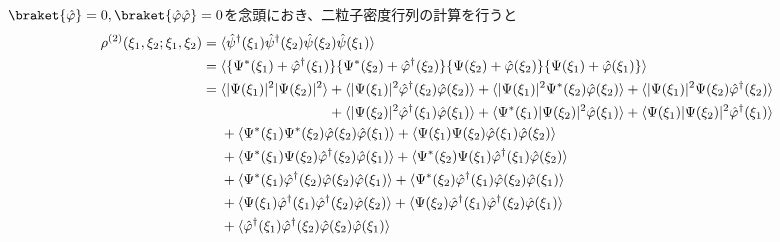 \documentclass[dvipdfmx, 11pt, a4paper]{jsarticle}
\numberwithin{equation}{section}
\theoremstyle{definition}
\begin{document}
    \begin{derivationBox}
        $\braket{\hat{\varphi}} = 0,\braket{\hat{\varphi}\hat{\varphi}} = 0$を念頭におき、二粒子密度行列の計算を行うと
        \begin{align}
            \rho^{(2)} (\xi_1,\xi_2;\xi_1,\xi_2) &= \langle \hat{\psi}^\dagger(\xi_1) \hat{\psi}^\dagger(\xi_2) \hat{\psi}(\xi_2) \hat{\psi}(\xi_1)\rangle  \notag \\
            &= \langle \{ \Psi^*(\xi_1) + \hat{\varphi}^\dagger(\xi_1) \} \{ \Psi^*(\xi_2) + \hat{\varphi}^\dagger(\xi_2) \} \{ \Psi(\xi_2) + \hat{\varphi}(\xi_2) \} \{ \Psi(\xi_1) + \hat{\varphi}(\xi_1) \}\rangle \notag \\
            &= \langle |\Psi (\xi_1)|^2 |\Psi (\xi_2)|^2\rangle  + \langle |\Psi (\xi_1)|^2 \hat{\varphi}^\dagger(\xi_2) \hat{\varphi}(\xi_2)\rangle + \langle |\Psi (\xi_1)|^2 \Psi^*(\xi_2)\hat{\varphi}(\xi_2)\rangle + \langle |\Psi (\xi_1)|^2 \Psi (\xi_2)\hat{\varphi}^\dagger(\xi_2)\rangle  \notag \\
            &\ \ \ \ \ \ \ \ \ \ \ \ \ \ \ \ \ \ \ \ \ \ \ \ \ \ \ + \langle |\Psi (\xi_2)|^2 \hat{\varphi}^\dagger(\xi_1) \hat{\varphi}(\xi_1)\rangle  + \langle \Psi^* (\xi_1)|\Psi (\xi_2)|^2 \hat{\varphi}(\xi_1)\rangle + \langle \Psi (\xi_1)|\Psi (\xi_2)|^2 \hat{\varphi}^\dagger(\xi_1)\rangle \notag \\
            &\ \ \ \ + \langle \Psi^* (\xi_1) \Psi^* (\xi_2) \hat{\varphi}(\xi_2) \hat{\varphi}(\xi_1)\rangle + \langle \Psi (\xi_1) \Psi (\xi_2) \hat{\varphi}(\xi_1) \hat{\varphi}(\xi_2)\rangle \notag \\
            &\ \ \ \ + \langle \Psi^* (\xi_1) \Psi(\xi_2)\hat{\varphi}^\dagger(\xi_2) \hat{\varphi}(\xi_1)\rangle + \langle \Psi^* (\xi_2) \Psi(\xi_1)\hat{\varphi}^\dagger(\xi_1) \hat{\varphi}(\xi_2)\rangle \notag \\
            &\ \ \ \ +\langle \Psi^* (\xi_1) \hat{\varphi}^\dagger(\xi_2)\hat{\varphi}(\xi_2) \hat{\varphi}(\xi_1)\rangle +\langle \Psi^* (\xi_2) \hat{\varphi}^\dagger(\xi_1)\hat{\varphi}(\xi_2) \hat{\varphi}(\xi_1)\rangle  \notag \\
            &\ \ \ \ +\langle \Psi (\xi_1) \hat{\varphi}^\dagger(\xi_1)\hat{\varphi}^\dagger(\xi_2) \hat{\varphi}(\xi_2)\rangle  +\langle \Psi (\xi_2) \hat{\varphi}^\dagger(\xi_1)\hat{\varphi}^\dagger(\xi_2) \hat{\varphi}(\xi_1)\rangle \notag \\
            &\ \ \ \ + \langle \hat{\varphi}^\dagger(\xi_1) \hat{\varphi}^\dagger(\xi_2) \hat{\varphi}(\xi_2) \hat{\varphi}(\xi_1)\rangle \notag \\

\end{align}
\end{derivationBox}
\end{document}
